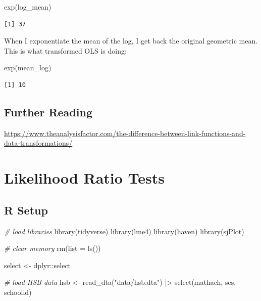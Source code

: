 \documentclass[
  letterpaper,
  DIV=11,
  numbers=noendperiod]{scrreprt}
\newenvironment{Shaded}{\begin{snugshade}}{\end{snugshade}}
\newcommand{\AttributeTok}[1]{\textcolor[rgb]{0.49,0.56,0.16}{#1}}
\newcommand{\CommentTok}[1]{\textcolor[rgb]{0.38,0.63,0.69}{\textit{#1}}}
\newcommand{\FunctionTok}[1]{\textcolor[rgb]{0.02,0.16,0.49}{#1}}
\newcommand{\NormalTok}[1]{\textcolor[rgb]{0.00,0.44,0.13}{#1}}
\newcommand{\OtherTok}[1]{\textcolor[rgb]{0.00,0.44,0.13}{#1}}
\newcommand{\SpecialCharTok}[1]{\textcolor[rgb]{0.25,0.44,0.63}{#1}}
\newcommand{\StringTok}[1]{\textcolor[rgb]{0.25,0.44,0.63}{#1}}
\begin{document}
\begin{Shaded}
\begin{Highlighting}[]
\FunctionTok{exp}\NormalTok{(log\_mean)}
\end{Highlighting}
\end{Shaded}

\begin{verbatim}
[1] 37
\end{verbatim}

When I exponentiate the mean of the log, I get back the original
geometric mean. This is what transformed OLS is doing:

\begin{Shaded}
\begin{Highlighting}[]
\FunctionTok{exp}\NormalTok{(mean\_log)}
\end{Highlighting}
\end{Shaded}

\begin{verbatim}
[1] 10
\end{verbatim}

\hypertarget{further-reading-2}{%
\section{Further Reading}\label{further-reading-2}}

\url{https://www.theanalysisfactor.com/the-difference-between-link-functions-and-data-transformations/}

\hypertarget{likelihood-ratio-tests}{%
\chapter{Likelihood Ratio Tests}\label{likelihood-ratio-tests}}

\hypertarget{r-setup-1}{%
\section{R Setup}\label{r-setup-1}}

\begin{Shaded}
\begin{Highlighting}[]
\CommentTok{\# load libraries}
\FunctionTok{library}\NormalTok{(tidyverse)}
\FunctionTok{library}\NormalTok{(lme4)}
\FunctionTok{library}\NormalTok{(haven)}
\FunctionTok{library}\NormalTok{(sjPlot)}

\CommentTok{\# clear memory}
\FunctionTok{rm}\NormalTok{(}\AttributeTok{list =} \FunctionTok{ls}\NormalTok{())}

\NormalTok{select }\OtherTok{\textless{}{-}}\NormalTok{ dplyr}\SpecialCharTok{::}\NormalTok{select}

\CommentTok{\# load HSB data}
\NormalTok{hsb }\OtherTok{\textless{}{-}} \FunctionTok{read\_dta}\NormalTok{(}\StringTok{"data/hsb.dta"}\NormalTok{) }\SpecialCharTok{|\textgreater{}} 
  \FunctionTok{select}\NormalTok{(mathach, ses, schoolid)}
\end{Highlighting}
\end{Shaded}
\end{document}
